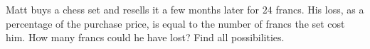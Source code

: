 Matt buys a chess set and resells it a few months later for $24$ francs. His loss, as a percentage of the purchase price, is equal to the number of francs the set cost him. How many francs could he have lost? Find all possibilities.
